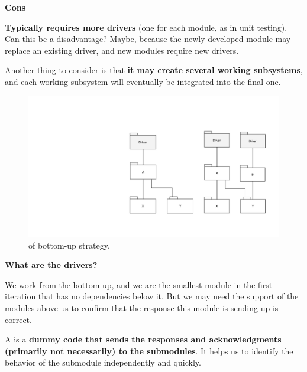\begin{itemize}
\begin{itemize}
\begin{itemize}
            \highspace
            \begin{flushleft}
                \textcolor{Red2}{ \textbf{Cons}}
            \end{flushleft}
            \textbf{Typically requires more drivers} (one for each module, as in unit testing). Can this be a disadvantage? Maybe, because the newly developed module may replace an existing driver, and new modules require new drivers.

            Another thing to consider is that \textbf{it may create several working subsystems}, and each working subsystem will eventually be integrated into the final one.

            \begin{figure}[!htp]
                \centering
                \includegraphics[width=.6\textwidth]{img/bottom-up-1.pdf}
                \caption{ of bottom-up strategy.}
            \end{figure}

            \begin{flushleft}
                \textcolor{Green3}{ \textbf{What are the drivers?}}
            \end{flushleft}
            We work from the bottom up, and we are the smallest module in the first iteration that has no dependencies below it. But we may need the support of the modules above us to confirm that the response this module is sending up is correct.

            A  is a \textbf{dummy code that sends the responses and acknowledgments (primarily not necessarily) to the submodules}. It helps us to identify the behavior of the submodule independently and quickly.
        \end{itemize}

        \newpage


\end{itemize}
\end{itemize}
